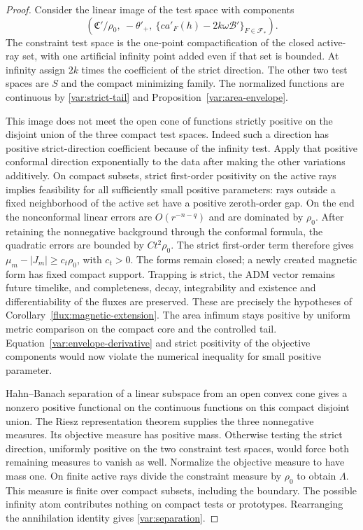 \begin{proof}
Consider the linear image of the test space with components
\begin{equation}
 \left(\mathfrak C'/\rho_0,\ -\theta'_+,\
       \{c a'_F(h)-2k\omega\mathcal B'\}_{F\in\mathcal F_*}\right).
 \label{var:separation-map}
\end{equation}
The constraint test space is the one-point compactification of the
closed active-ray set, with one artificial infinity point added even
if that set is bounded.  At infinity assign $2k$ times the
coefficient of the strict direction.  The other two test spaces are
$S$ and the compact minimizing family.  The normalized functions
are continuous by \eqref{var:strict-tail} and
Proposition~\ref{var:area-envelope}.

This image does not meet the open cone of functions strictly
positive on the disjoint union of the three compact test spaces.
Indeed such a direction has positive strict-direction coefficient
because of the infinity test.  Apply that positive conformal
direction exponentially to the data after making the other
variations additively.  On compact subsets, strict first-order
positivity on the active rays implies feasibility for all
sufficiently small positive parameters: rays outside a fixed
neighborhood of the active set have a positive zeroth-order gap.
On the end the nonconformal linear errors are $O(r^{-n-q})$ and
are dominated by $\rho_0$.  After retaining the nonnegative
background through the conformal formula, the quadratic errors are
bounded by $Ct^2\rho_0$.  The strict first-order term therefore
gives $\mu_m-|J_m|\ge c_t\rho_0$, with $c_t>0$.
The forms remain closed; a newly created magnetic form has fixed
compact support.  Trapping is strict, the ADM vector remains
future timelike, and completeness, decay, integrability and
existence and differentiability of the fluxes are preserved.
These are precisely the hypotheses of
Corollary~\ref{flux:magnetic-extension}.  The area infimum stays
positive by uniform metric comparison on the compact core and
the controlled tail.  Equation~\eqref{var:envelope-derivative}
and strict positivity of the objective components would now
violate the numerical inequality for small positive parameter.

Hahn--Banach separation of a linear subspace from an open convex
cone gives a nonzero positive functional on the continuous
functions on this compact disjoint union.  The Riesz
representation theorem supplies the three nonnegative measures.
Its objective measure has positive mass.  Otherwise testing the
strict direction, uniformly positive on the two constraint test
spaces, would force both remaining measures to vanish as well.
Normalize the objective measure to have mass one.  On finite
active rays divide the constraint measure by $\rho_0$ to obtain
$\Lambda$.  This measure is finite over compact subsets,
including the boundary.  The possible infinity atom contributes
nothing on compact tests or prototypes.  Rearranging the
annihilation identity gives \eqref{var:separation}.
\end{proof}

